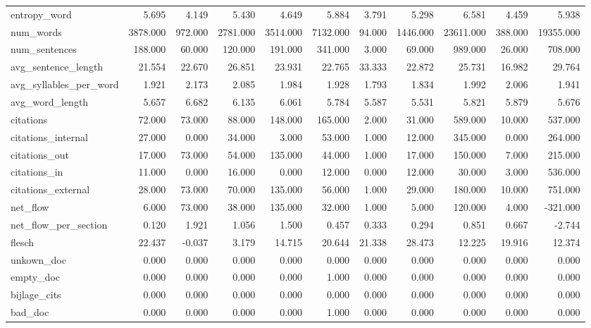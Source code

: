 \begin{tabular}{lrrrrrrrrrr}
\cline{1-11}
entropy\_word & 5.695 & 4.149 & 5.430 & 4.649 & 5.884 & 3.791 & 5.298 & 6.581 & 4.459 & 5.938 \\
\cline{1-11}
num\_words & 3878.000 & 972.000 & 2781.000 & 3514.000 & 7132.000 & 94.000 & 1446.000 & 23611.000 & 388.000 & 19355.000 \\
\cline{1-11}
num\_sentences & 188.000 & 60.000 & 120.000 & 191.000 & 341.000 & 3.000 & 69.000 & 989.000 & 26.000 & 708.000 \\
\cline{1-11}
avg\_sentence\_length & 21.554 & 22.670 & 26.851 & 23.931 & 22.765 & 33.333 & 22.872 & 25.731 & 16.982 & 29.764 \\
\cline{1-11}
avg\_syllables\_per\_word & 1.921 & 2.173 & 2.085 & 1.984 & 1.928 & 1.793 & 1.834 & 1.992 & 2.006 & 1.941 \\
\cline{1-11}
avg\_word\_length & 5.657 & 6.682 & 6.135 & 6.061 & 5.784 & 5.587 & 5.531 & 5.821 & 5.879 & 5.676 \\
\cline{1-11}
citations & 72.000 & 73.000 & 88.000 & 148.000 & 165.000 & 2.000 & 31.000 & 589.000 & 10.000 & 537.000 \\
\cline{1-11}
citations\_internal & 27.000 & 0.000 & 34.000 & 3.000 & 53.000 & 1.000 & 12.000 & 345.000 & 0.000 & 264.000 \\
\cline{1-11}
citations\_out & 17.000 & 73.000 & 54.000 & 135.000 & 44.000 & 1.000 & 17.000 & 150.000 & 7.000 & 215.000 \\
\cline{1-11}
citations\_in & 11.000 & 0.000 & 16.000 & 0.000 & 12.000 & 0.000 & 12.000 & 30.000 & 3.000 & 536.000 \\
\cline{1-11}
citations\_external & 28.000 & 73.000 & 70.000 & 135.000 & 56.000 & 1.000 & 29.000 & 180.000 & 10.000 & 751.000 \\
\cline{1-11}
net\_flow & 6.000 & 73.000 & 38.000 & 135.000 & 32.000 & 1.000 & 5.000 & 120.000 & 4.000 & -321.000 \\
\cline{1-11}
net\_flow\_per\_section & 0.120 & 1.921 & 1.056 & 1.500 & 0.457 & 0.333 & 0.294 & 0.851 & 0.667 & -2.744 \\
\cline{1-11}
flesch & 22.437 & -0.037 & 3.179 & 14.715 & 20.644 & 21.338 & 28.473 & 12.225 & 19.916 & 12.374 \\
\cline{1-11}
unkown\_doc & 0.000 & 0.000 & 0.000 & 0.000 & 0.000 & 0.000 & 0.000 & 0.000 & 0.000 & 0.000 \\
\cline{1-11}
empty\_doc & 0.000 & 0.000 & 0.000 & 0.000 & 1.000 & 0.000 & 0.000 & 0.000 & 0.000 & 0.000 \\
\cline{1-11}
bijlage\_cits & 0.000 & 0.000 & 0.000 & 0.000 & 0.000 & 0.000 & 0.000 & 0.000 & 0.000 & 0.000 \\
\cline{1-11}
bad\_doc & 0.000 & 0.000 & 0.000 & 0.000 & 1.000 & 0.000 & 0.000 & 0.000 & 0.000 & 0.000 \\
\cline{1-11}
\bottomrule
\end{tabular}

